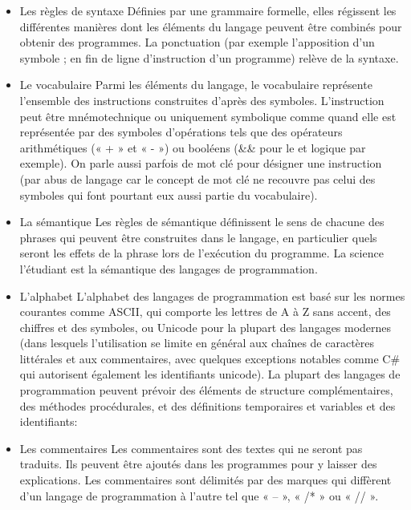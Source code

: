 \documentclass[a4paper,12pt]{article}
\begin{document}
\begin{itemize}[label=\textbullet]

\setlength{\itemindent}{-1.5em}

\item Les règles de syntaxe
\newline Définies par une grammaire formelle, elles régissent les différentes manières dont les éléments du langage peuvent être combinés pour obtenir des programmes\cite{kenneth}. La ponctuation (par exemple l'apposition d'un symbole ; en fin de ligne d'instruction d'un programme) relève de la syntaxe.

\item Le vocabulaire
\newline Parmi les éléments du langage, le vocabulaire représente l'ensemble des instructions construites d’après des symboles. L'instruction peut être mnémotechnique ou uniquement symbolique comme quand elle est représentée par des symboles d'opérations tels que des opérateurs arithmétiques (« + » et « - ») ou booléens (\&\& pour le et logique par exemple). On parle aussi parfois de mot clé pour désigner une instruction (par abus de langage car le concept de mot clé ne recouvre pas celui des symboles qui font pourtant eux aussi partie du vocabulaire).

\item La sémantique
\newline Les règles de sémantique définissent le sens de chacune des phrases qui peuvent être construites dans le langage, en particulier quels seront les effets de la phrase lors de l'exécution du programme\cite{kenneth}. La science l'étudiant est la sémantique des langages de programmation.

\item L'alphabet
\newline L'alphabet des langages de programmation est basé sur les normes courantes comme ASCII, qui comporte les lettres de A à Z sans accent, des chiffres et des symboles\cite{seema}, ou Unicode pour la plupart des langages modernes (dans lesquels l'utilisation se limite en général aux chaînes de caractères littérales et aux commentaires, avec quelques exceptions notables comme C\# qui autorisent également les identifiants unicode).
\newline La plupart des langages de programmation peuvent prévoir des éléments de structure complémentaires, des méthodes procédurales, et des définitions temporaires et variables et des identifiants:

\item Les commentaires
\newline Les commentaires sont des textes qui ne seront pas traduits. Ils peuvent être ajoutés dans les programmes pour y laisser des explications. Les commentaires sont délimités par des marques qui diffèrent d'un langage de programmation à l'autre tel que « -- », « /* » ou « // »\cite{seema}.


\end{itemize}
\end{document}

